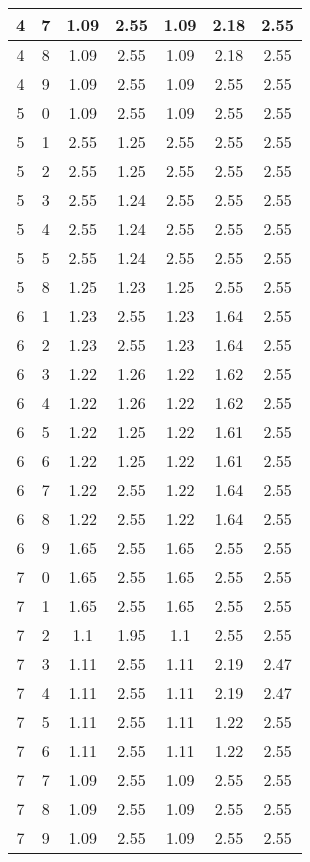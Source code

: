 \begin{longtable}{|c|c||c||c||c|c|c|}
	4 & 7 & 1.09 & 2.55 & 1.09 & 2.18 & 2.55 \\ \hline
	4 & 8 & 1.09 & 2.55 & 1.09 & 2.18 & 2.55 \\ \hline
	4 & 9 & 1.09 & 2.55 & 1.09 & 2.55 & 2.55 \\ \hline
	5 & 0 & 1.09 & 2.55 & 1.09 & 2.55 & 2.55 \\ \hline
	5 & 1 & 2.55 & 1.25 & 2.55 & 2.55 & 2.55 \\ \hline
	5 & 2 & 2.55 & 1.25 & 2.55 & 2.55 & 2.55 \\ \hline
	5 & 3 & 2.55 & 1.24 & 2.55 & 2.55 & 2.55 \\ \hline
	5 & 4 & 2.55 & 1.24 & 2.55 & 2.55 & 2.55 \\ \hline
	5 & 5 & 2.55 & 1.24 & 2.55 & 2.55 & 2.55 \\ \hline
	5 & 8 & 1.25 & 1.23 & 1.25 & 2.55 & 2.55 \\ \hline
	6 & 1 & 1.23 & 2.55 & 1.23 & 1.64 & 2.55 \\ \hline
	6 & 2 & 1.23 & 2.55 & 1.23 & 1.64 & 2.55 \\ \hline
	6 & 3 & 1.22 & 1.26 & 1.22 & 1.62 & 2.55 \\ \hline
	6 & 4 & 1.22 & 1.26 & 1.22 & 1.62 & 2.55 \\ \hline
	6 & 5 & 1.22 & 1.25 & 1.22 & 1.61 & 2.55 \\ \hline
	6 & 6 & 1.22 & 1.25 & 1.22 & 1.61 & 2.55 \\ \hline
	6 & 7 & 1.22 & 2.55 & 1.22 & 1.64 & 2.55 \\ \hline
	6 & 8 & 1.22 & 2.55 & 1.22 & 1.64 & 2.55 \\ \hline
	6 & 9 & 1.65 & 2.55 & 1.65 & 2.55 & 2.55 \\ \hline
	7 & 0 & 1.65 & 2.55 & 1.65 & 2.55 & 2.55 \\ \hline
	7 & 1 & 1.65 & 2.55 & 1.65 & 2.55 & 2.55 \\ \hline
	7 & 2 & 1.1 & 1.95 & 1.1 & 2.55 & 2.55 \\ \hline
	7 & 3 & 1.11 & 2.55 & 1.11 & 2.19 & 2.47 \\ \hline
	7 & 4 & 1.11 & 2.55 & 1.11 & 2.19 & 2.47 \\ \hline
	7 & 5 & 1.11 & 2.55 & 1.11 & 1.22 & 2.55 \\ \hline
	7 & 6 & 1.11 & 2.55 & 1.11 & 1.22 & 2.55 \\ \hline
	7 & 7 & 1.09 & 2.55 & 1.09 & 2.55 & 2.55 \\ \hline
	7 & 8 & 1.09 & 2.55 & 1.09 & 2.55 & 2.55 \\ \hline
	7 & 9 & 1.09 & 2.55 & 1.09 & 2.55 & 2.55 \\ \hline
\end{longtable}

